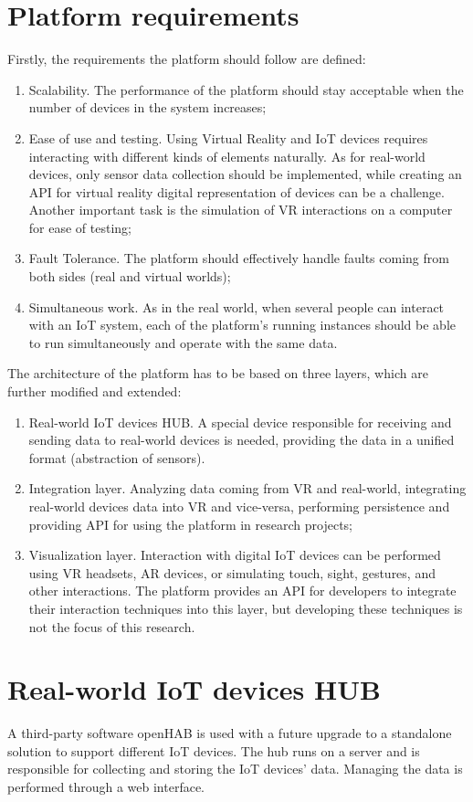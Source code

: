 \section{Platform requirements}
Firstly, the requirements the platform should follow are defined:
\begin{enumerate}
\item Scalability. The performance of the platform should stay acceptable when the number of devices in the system increases;
\item Ease of use and testing. Using Virtual Reality and IoT devices requires interacting with different kinds of elements naturally. As for real-world devices, only sensor data collection should be implemented, while creating an API for virtual reality digital representation of devices can be a challenge. Another important task is the simulation of VR interactions on a computer for ease of testing;
\item Fault Tolerance. The platform should effectively handle faults coming from both sides (real and virtual worlds);
\item Simultaneous work. As in the real world, when several people can interact with an IoT system, each of the platform's running instances should be able to run simultaneously and operate with the same data.
\end{enumerate}
The architecture of the platform has to be based on three layers, which are further modified and extended: 
\begin{enumerate}
    \item Real-world IoT devices HUB. A special device responsible for receiving and sending data to real-world devices is needed, providing the data in a unified format (abstraction of sensors).
    \item Integration layer. Analyzing data coming from VR and real-world, integrating real-world devices data into VR and vice-versa, performing persistence and providing API for using the platform in research projects;
    \item Visualization layer. Interaction with digital IoT devices can be performed using VR headsets, AR devices, or simulating touch, sight, gestures, and other interactions. The platform provides an API for developers to integrate their interaction techniques into this layer, but developing these techniques is not the focus of this research. 
\end{enumerate}

\section{Real-world IoT devices HUB}
A third-party software openHAB is used with a future upgrade to a standalone solution to support different IoT devices. The hub runs on a server and is responsible for collecting and storing the IoT devices' data. Managing the data is performed through a web interface.

